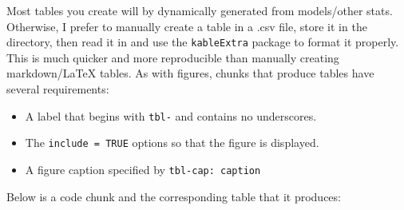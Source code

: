 \documentclass[../main.tex]{subfiles}
\begin{document}
Most tables you create will by dynamically generated from models/other
stats. Otherwise, I prefer to manually create a table in a .csv file,
store it in the directory, then read it in and use the
\texttt{kableExtra} package to format it properly. This is much quicker
and more reproducible than manually creating markdown/LaTeX tables. As
with figures, chunks that produce tables have several requirements:

\begin{itemize}
\tightlist
\item
  A label that begins with \texttt{tbl-} and contains no underscores.
\item
  The \texttt{include\ =\ TRUE} options so that the figure is displayed.
\item
  A figure caption specified by \texttt{tbl-cap:\ caption}
\end{itemize}

Below is a code chunk and the corresponding table that it produces:

\begin{Shaded}
\begin{Highlighting}[]

\OtherTok{\textless{}{-}} \NormalTok{(}\NormalTok{) }


 \NormalTok{)                 }
\end{Highlighting}
\end{Shaded}

\begin{table}[!ht]

\caption{\label{tbl-example}An example of a properly formatted table.}


\end{table}%
\end{document}
